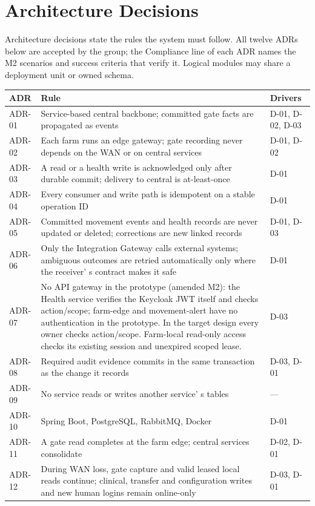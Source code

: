 \section{Architecture Decisions}\label{sec:5}

Architecture decisions state the rules the system must follow. All
twelve ADRs below are accepted by the group; the Compliance line of each
ADR names the M2 scenarios and success criteria that verify it. Logical modules may share a
deployment unit or owned schema.

{\small
\begin{longtable}[]{|>{\raggedright\arraybackslash}p{}|>{\raggedright\arraybackslash}p{}|>{\raggedright\arraybackslash}p{}|}
\hline
\textbf{ADR} & \textbf{Rule} & \textbf{Drivers} \\ \hline
\endhead
ADR-01 & Service-based central backbone; committed gate facts are
propagated as events & D-01, D-02, D-03 \\ \hline
ADR-02 & Each farm runs an edge gateway; gate recording never depends on
the WAN or on central services & D-01, D-02 \\ \hline
ADR-03 & A read or a health write is acknowledged only after durable
commit; delivery to central is at-least-once & D-01 \\ \hline
ADR-04 & Every consumer and write path is idempotent on a stable
operation ID & D-01 \\ \hline
ADR-05 & Committed movement events and health records are never updated
or deleted; corrections are new linked records & D-01, D-03 \\ \hline
ADR-06 & Only the Integration Gateway calls external systems; ambiguous
outcomes are retried automatically only where the
receiver' s contract makes it safe & D-01 \\ \hline
ADR-07 & No API gateway in the prototype (amended M2): the Health
service verifies the Keycloak JWT itself and checks action/scope; farm-edge and movement-alert have no authentication in the prototype. In the target design every owner checks action/scope. Farm-local read-only access checks its existing session
and unexpired scoped lease. & D-03 \\ \hline
ADR-08 & Required audit evidence commits in the same transaction as the
change it records & D-03, D-01 \\ \hline
ADR-09 & No service reads or writes another service' s
tables & --- \\ \hline
ADR-10 & Spring Boot, PostgreSQL, RabbitMQ, Docker & D-01 \\ \hline
ADR-11 & A gate read completes at the farm edge; central services
consolidate & D-02, D-01 \\ \hline
ADR-12 & During WAN loss, gate capture and valid leased local reads
continue; clinical, transfer and configuration writes and new human
logins remain online-only & D-03, D-01 \\ \hline
\end{longtable}
}

